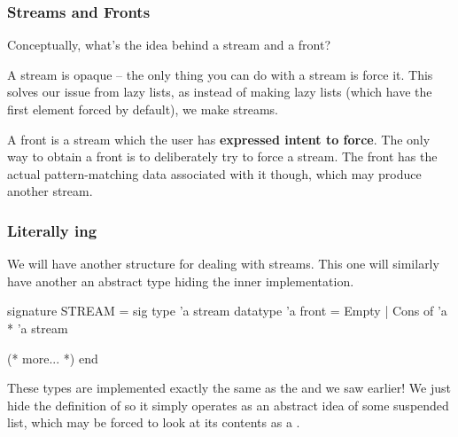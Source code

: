 \documentclass[aspectratio=169]{beamer}
\begin{document}
\begin{frame}[fragile]
  \frametitle{Streams and Fronts}

  \tgs

  Conceptually, what's the idea behind a stream and a front?

  \pause
  \vspace{\fill}

  \pause

  \pause
  \vspace{\fill}

  A stream is opaque -- the only thing you can do with a stream
  is force it. This solves our issue from lazy lists, as instead of making lazy
  lists (which have the first element forced by default), we make streams.

  \pause
  \vspace{\fill}

  A front is a stream which the user has \textbf{expressed intent to force}. The
  only way to obtain a front is to deliberately try to force a stream. The front
  has the actual pattern-matching data associated with it though, which may
  produce another stream.
\end{frame}

\begin{frame}[fragile]
  \frametitle{Literally ing}

  We will have another structure for dealing with streams. This one will similarly
  have another an abstract type hiding the inner implementation.

  \pause
  \vspace{\fill}

  \begin{codeblock}
    signature STREAM =
      sig
        type 'a stream
        datatype 'a front = Empty | Cons of 'a * 'a stream

        (* more... *)
      end
  \end{codeblock}

  \pause
  \vspace{\fill}

  These types are implemented exactly the same as the  and
   we saw earlier! We just hide the definition of 
  so it simply operates as an abstract idea of some suspended list, which may
  be forced to look at its contents as a .
\end{frame}
\end{document}
